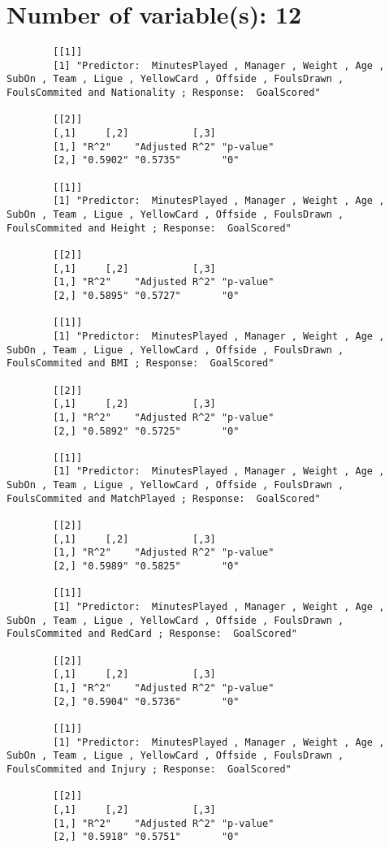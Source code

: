 \documentclass[12pt]{article}
\begin{document}
	\section{Number of variable(s): 12}
	
	\begin{verbatim}
		[[1]]
		[1] "Predictor:  MinutesPlayed , Manager , Weight , Age , SubOn , Team , Ligue , YellowCard , Offside , FoulsDrawn , FoulsCommited and Nationality ; Response:  GoalScored"
		
		[[2]]
		[,1]     [,2]           [,3]     
		[1,] "R^2"    "Adjusted R^2" "p-value"
		[2,] "0.5902" "0.5735"       "0"      
		
		[[1]]
		[1] "Predictor:  MinutesPlayed , Manager , Weight , Age , SubOn , Team , Ligue , YellowCard , Offside , FoulsDrawn , FoulsCommited and Height ; Response:  GoalScored"
		
		[[2]]
		[,1]     [,2]           [,3]     
		[1,] "R^2"    "Adjusted R^2" "p-value"
		[2,] "0.5895" "0.5727"       "0"      
		
		[[1]]
		[1] "Predictor:  MinutesPlayed , Manager , Weight , Age , SubOn , Team , Ligue , YellowCard , Offside , FoulsDrawn , FoulsCommited and BMI ; Response:  GoalScored"
		
		[[2]]
		[,1]     [,2]           [,3]     
		[1,] "R^2"    "Adjusted R^2" "p-value"
		[2,] "0.5892" "0.5725"       "0"      
		
		[[1]]
		[1] "Predictor:  MinutesPlayed , Manager , Weight , Age , SubOn , Team , Ligue , YellowCard , Offside , FoulsDrawn , FoulsCommited and MatchPlayed ; Response:  GoalScored"
		
		[[2]]
		[,1]     [,2]           [,3]     
		[1,] "R^2"    "Adjusted R^2" "p-value"
		[2,] "0.5989" "0.5825"       "0"      
		
		[[1]]
		[1] "Predictor:  MinutesPlayed , Manager , Weight , Age , SubOn , Team , Ligue , YellowCard , Offside , FoulsDrawn , FoulsCommited and RedCard ; Response:  GoalScored"
		
		[[2]]
		[,1]     [,2]           [,3]     
		[1,] "R^2"    "Adjusted R^2" "p-value"
		[2,] "0.5904" "0.5736"       "0"      
		
		[[1]]
		[1] "Predictor:  MinutesPlayed , Manager , Weight , Age , SubOn , Team , Ligue , YellowCard , Offside , FoulsDrawn , FoulsCommited and Injury ; Response:  GoalScored"
		
		[[2]]
		[,1]     [,2]           [,3]     
		[1,] "R^2"    "Adjusted R^2" "p-value"
		[2,] "0.5918" "0.5751"       "0"    
		
	\end{verbatim}
	
	
	
	
\end{document}
